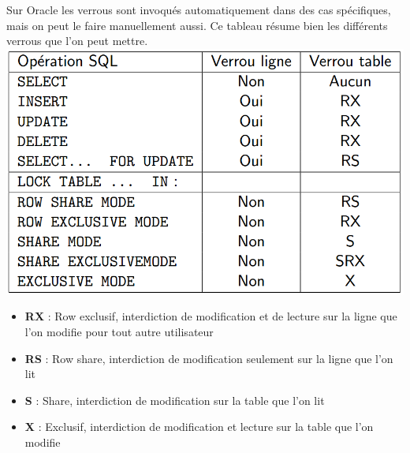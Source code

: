\documentclass{report}
\begin{document}
Sur Oracle les verrous sont invoqués automatiquement dans des cas spécifiques, mais on peut le faire manuellement aussi. Ce tableau résume bien les différents verrous que l'on peut mettre.
\newline
\includegraphics[scale=0.45]{./Pictures/BD4.png}
\newline
\begin{itemize}
\item \textbf{RX} : Row exclusif, interdiction de modification et de lecture sur la ligne que l'on modifie pour tout autre utilisateur
\item \textbf{RS} : Row share, interdiction de modification seulement sur la ligne que l'on lit
\item \textbf{S} : Share, interdiction de modification sur la table que l'on lit
\item \textbf{X} : Exclusif, interdiction de modification et lecture sur la table que l'on modifie
\end{itemize}
\end{document}
